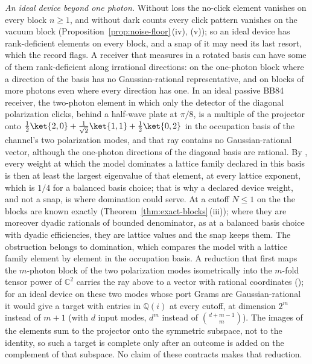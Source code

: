 \begin{remark}
\emph{An ideal device beyond one photon.} Without loss the no-click element
vanishes on every block $n\ge1$, and without dark counts every click pattern
vanishes on the vacuum block (Proposition~\ref{prop:noise-floor}\,(iv),
(v)); so an ideal device has rank-deficient elements on every block, and a
snap of it may need its last resort, which the record flags. A receiver that
measures in a rotated basis can have some of them rank-deficient along
irrational directions: on the one-photon block where a direction of the
basis has no Gaussian-rational representative, and on blocks of more photons
even where every direction has one. In an ideal passive BB84 receiver, the
two-photon element in which only the detector of the diagonal polarization
clicks, behind a half-wave plate at $\pi/8$, is a multiple of the projector
onto $\tfrac12\ket{2,0}+\tfrac1{\sqrt2}\ket{1,1}+\tfrac12\ket{0,2}$ in the
occupation basis of the channel's two polarization modes, and that ray
contains no Gaussian-rational vector, although the one-photon directions of
the diagonal basis are rational. By
, every weight at which the model
dominates a lattice family declared in this basis is then at least the
largest eigenvalue of that element, at every lattice exponent, which is $1/4$
for a balanced basis choice; that is why a declared device weight, and not a
snap, is where domination could serve. At a cutoff $N\le1$ on the
 the blocks are known exactly
(Theorem~\ref{thm:exact-blocks}\,(iii)); where they are moreover dyadic
rationals of bounded denominator, as at a balanced basis choice with dyadic
efficiencies, they are lattice values and the snap keeps them. The
obstruction belongs to domination, which compares the model with a lattice
family element by element in the occupation basis. A reduction that first
maps the $m$-photon block of the two polarization modes isometrically into
the $m$-fold tensor power of $\mathbb{C}^{2}$ carries the ray above to a
vector with rational coordinates (); for
an ideal device on these two modes whose port Grams are Gaussian-rational it
would give a target with entries in $\mathbb{Q}(i)$ at every cutoff, at
dimension $2^{m}$ instead of $m+1$ (with $d$ input modes, $d^{m}$ instead of
$\binom{d+m-1}{m}$). The images of the elements sum to the projector onto
the symmetric subspace, not to the identity, so such a target is complete
only after an outcome is added on the complement of that subspace. No claim
of these contracts makes that reduction.


\end{remark}
